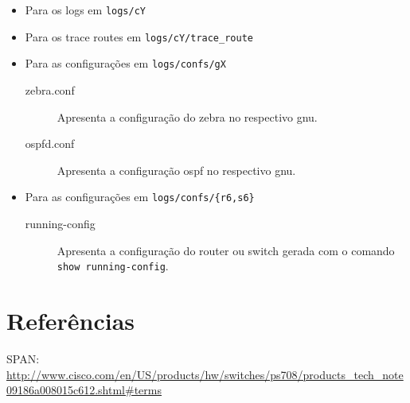 \documentclass[a4paper,12pt]{article}
\begin{document}
\begin{itemize}
	\item Para os logs em \verb-logs/cY-
	\item Para os trace routes em \verb-logs/cY/trace_route-
	\item Para as configurações em \verb-logs/confs/gX-
		\begin{description}
			\item[zebra.conf] Apresenta a configuração do zebra no respectivo
				gnu.
			\item[ospfd.conf] Apresenta a configuração ospf no respectivo gnu.
		\end{description}
	\item Para as configurações em \verb-logs/confs/{r6,s6}-
		\begin{description}
			\item[running-config] Apresenta a configuração do router ou switch
				gerada com o comando \verb_show running-config_.
		\end{description}
\end{itemize}


\section{Referências}

SPAN: \url{http://www.cisco.com/en/US/products/hw/switches/ps708/products_tech_note09186a008015c612.shtml#terms}
\end{document}
